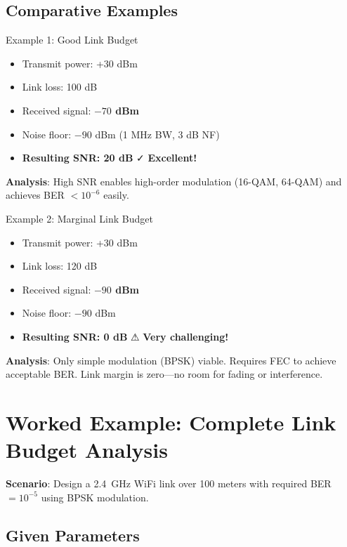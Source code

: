 \subsection{Comparative Examples}

\begin{calloutbox}{Example 1: Good Link Budget}
\begin{itemize}
\item Transmit power: +30 dBm
\item Link loss: 100 dB
\item Received signal: \textbf{$-70$ dBm}
\item Noise floor: $-90$ dBm (1 MHz BW, 3 dB NF)
\item \textbf{Resulting SNR: 20 dB} ✓ \textbf{Excellent!}
\end{itemize}

\textbf{Analysis}: High SNR enables high-order modulation (16-QAM, 64-QAM) and achieves BER $< 10^{-6}$ easily.
\end{calloutbox}

\begin{calloutbox}{Example 2: Marginal Link Budget}
\begin{itemize}
\item Transmit power: +30 dBm
\item Link loss: 120 dB
\item Received signal: \textbf{$-90$ dBm}
\item Noise floor: $-90$ dBm
\item \textbf{Resulting SNR: 0 dB} ⚠ \textbf{Very challenging!}
\end{itemize}

\textbf{Analysis}: Only simple modulation (BPSK) viable. Requires FEC to achieve acceptable BER. Link margin is zero---no room for fading or interference.
\end{calloutbox}

\section{Worked Example: Complete Link Budget Analysis}

\textbf{Scenario}: Design a 2.4~GHz WiFi link over 100 meters with required BER $= 10^{-5}$ using BPSK modulation.

\subsection*{Given Parameters}

